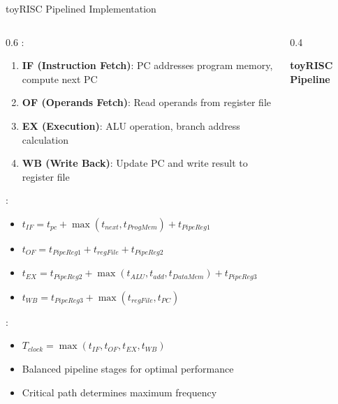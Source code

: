 \begin{frame}{toyRISC Pipelined Implementation}
\begin{columns}
\begin{column}{0.6\textwidth}
:
\begin{enumerate}
\item \textbf{IF (Instruction Fetch)}: PC addresses program memory, compute next PC
\item \textbf{OF (Operands Fetch)}: Read operands from register file
\item \textbf{EX (Execution)}: ALU operation, branch address calculation
\item \textbf{WB (Write Back)}: Update PC and write result to register file
\end{enumerate}

\vspace{0.3cm}
:
\begin{itemize}
\item $t_{IF} = t_{pc} + \max(t_{next}, t_{ProgMem}) + t_{PipeReg1}$
\item $t_{OF} = t_{PipeReg1} + t_{regFile} + t_{PipeReg2}$
\item $t_{EX} = t_{PipeReg2} + \max(t_{ALU}, t_{add}, t_{DataMem}) + t_{PipeReg3}$
\item $t_{WB} = t_{PipeReg3} + \max(t_{regFile}, t_{PC})$
\end{itemize}

\vspace{0.3cm}
:
\begin{itemize}
\item $T_{clock} = \max(t_{IF}, t_{OF}, t_{EX}, t_{WB})$
\item Balanced pipeline stages for optimal performance
\item Critical path determines maximum frequency
\end{itemize}
\end{column}
\begin{column}{0.4\textwidth}
\begin{center}
\textbf{toyRISC Pipeline}
\vspace{0.3cm}

\end{center}
\end{column}
\end{columns}
\end{frame}
